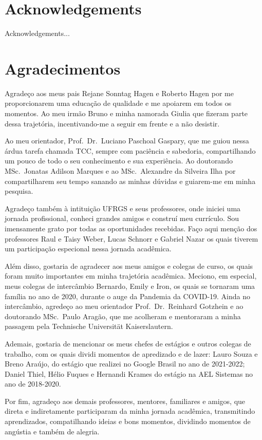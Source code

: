 \chapter*{Acknowledgements}

Acknowledgements...

\chapter*{Agradecimentos}

Agradeço aos meus pais Rejane Sonntag Hagen e Roberto Hagen por me proporcionarem uma educação de qualidade e me apoiarem em todos os momentos. Ao meu irmão Bruno e minha namorada Giulia que fizeram parte dessa trajetória, incentivando-me a seguir em frente e a não desistir.

Ao meu orientador, Prof.~Dr.~Luciano Paschoal Gaspary, que me guiou nessa árdua tarefa chamada TCC, sempre com paciência e sabedoria, compartilhando um pouco de todo o seu conhecimento e sua experiência. Ao doutorando MSc.~Jonatas Adilson Marques e ao MSc.~Alexandre da Silveira Ilha por compartilharem seu tempo sanando as minhas dúvidas e guiarem-me em minha pesquisa.

Agradeço também à intituição UFRGS e seus professores, onde iniciei uma jornada profissional, conheci grandes amigos e construí meu currículo. Sou imensamente grato por todas as oportunidades recebidas. Faço aqui menção dos professores Raul e Taisy Weber, Lucas Schnorr e Gabriel Nazar os quais tiverem um participação especional nessa jornada acadêmica.

Além disso, gostaria de agradecer aos meus amigos e colegas de curso, os quais foram muito importantes em minha trajetória acadêmica. Meciono, em especial, meus colegas de intercâmbio Bernardo, Emily e Iron, os quais se tornaram uma família no ano de 2020, durante o auge da Pandemia da COVID-19. Ainda no intercâmbio, agredeço ao meu orientador Prof.~Dr.~Reinhard Gotzhein e ao doutorando MSc.~Paulo Aragão, que me acolheram e mentoraram a minha passagem pela Technische Universität Kaiserslautern. 

Ademais, gostaria de mencionar os meus chefes de estágios e outros colegas de trabalho, com os quais dividi momentos de apredizado e de lazer: Lauro Souza e Breno Araújo, do estágio que realizei no Google Brasil no ano de 2021-2022; Daniel Thiel, Hélio Fuques e Hernandi Krames do estágio na AEL Sistemas no ano de 2018-2020.

Por fim, agradeço aos demais professores, mentores, familiares e amigos, que direta e indiretamente participaram da minha jornada acadêmica, transmitindo aprendizados, compatilhando ideias e bons momentos, dividindo momentos de angústia e também de alegria.

\clearpage